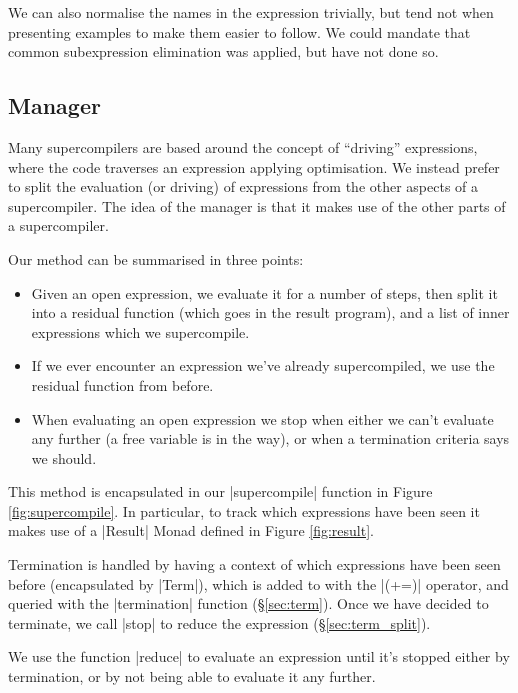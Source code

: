 \documentclass{sigplanconf}
\begin{document}
We can also normalise the names in the expression trivially, but tend not when presenting examples to make them easier to follow. We could mandate that common subexpression elimination was applied, but have not done so.

\subsection{Manager}

Many supercompilers are based around the concept of ``driving'' expressions, where the code traverses an expression applying optimisation. We instead prefer to split the evaluation (or driving) of expressions from the other aspects of a supercompiler. The idea of the manager is that it makes use of the other parts of a supercompiler.

Our method can be summarised in three points:

\begin{itemize}
\item Given an open expression, we evaluate it for a number of steps, then split it into a residual function (which goes in the result program), and a list of inner expressions which we supercompile.
\item If we ever encounter an expression we've already supercompiled, we use the residual function from before.
\item When evaluating an open expression we stop when either we can't evaluate any further (a free variable is in the way), or when a termination criteria says we should.
\end{itemize}

This method is encapsulated in our |supercompile| function in Figure \ref{fig:supercompile}. In particular, to track which expressions have been seen it makes use of a |Result| Monad defined in Figure \ref{fig:result}.

Termination is handled by having a context of which expressions have been seen before (encapsulated by |Term|), which is added to with the |(+=)| operator, and queried with the |termination| function (\S\ref{sec:term}). Once we have decided to terminate, we call |stop| to reduce the expression (\S\ref{sec:term_split}).

We use the function |reduce| to evaluate an expression until it's stopped either by termination, or by not being able to evaluate it any further.
\end{document}
